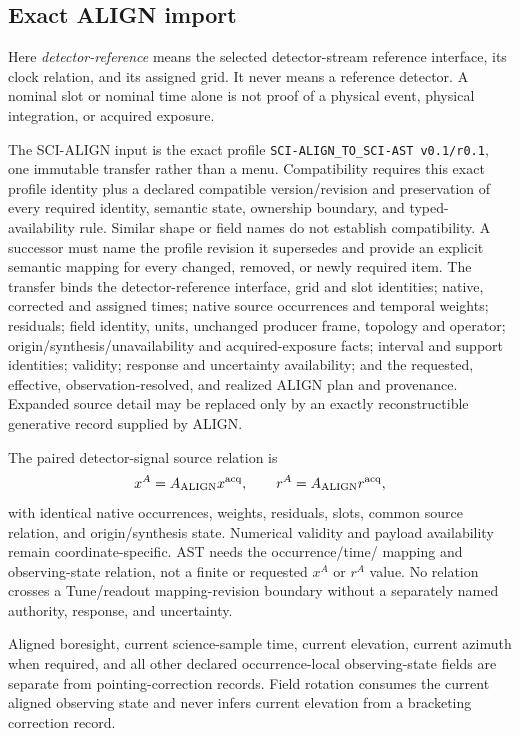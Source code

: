 \subsection{Exact ALIGN import}

Here \emph{detector-reference} means the selected detector-stream reference
interface, its clock relation, and its assigned grid.  It never means a
reference detector.  A nominal slot or nominal time alone is not proof of a
physical event, physical integration, or acquired exposure.

The SCI-ALIGN input is the exact profile
\nolinkurl{SCI-ALIGN_TO_SCI-AST v0.1/r0.1}, one immutable transfer rather than
a menu.  Compatibility requires this exact profile identity plus a declared
compatible version/revision and preservation of every required identity,
semantic state, ownership boundary, and typed-availability rule.  Similar
shape or field names do not establish compatibility.  A successor must name
the profile revision it supersedes and provide an explicit semantic mapping
for every changed, removed, or newly required item.  The transfer binds the
detector-reference interface, grid and slot identities; native, corrected and
assigned times; native source occurrences and temporal weights; residuals;
field identity, units, unchanged producer frame, topology and operator;
origin/synthesis/unavailability and acquired-exposure facts; interval and
support identities; validity; response and uncertainty availability; and the
requested, effective, observation-resolved, and realized ALIGN plan and
provenance.  Expanded source detail may be replaced only by an exactly
reconstructible generative record supplied by ALIGN.

The paired detector-signal source relation is
\begin{equation}
  x^A=A_{\rm ALIGN}x^{\rm acq},\qquad
  r^A=A_{\rm ALIGN}r^{\rm acq},
  \label{eq:paired-align}
\end{equation}
with identical native occurrences, weights, residuals, slots, common source
relation, and origin/synthesis state.  Numerical validity and payload
availability remain coordinate-specific.  AST needs the occurrence/time/
mapping and observing-state relation, not a finite or requested $x^A$ or
$r^A$ value.  No relation crosses a Tune/readout mapping-revision boundary
without a separately named authority, response, and uncertainty.

Aligned boresight, current science-sample time, current elevation, current
azimuth when required, and all other declared occurrence-local observing-state
fields are separate from pointing-correction records.  Field rotation consumes
the current aligned observing state and never infers current elevation from a
bracketing correction record.

